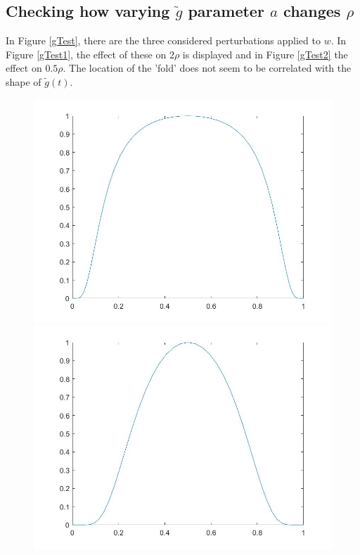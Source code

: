 \documentclass[11pt, a4paper]{article}
\theoremstyle{definition}
\begin{document}
\subsection{Checking how varying $\tilde g$ parameter $a$ changes $\rho$}
	In Figure \ref{gTest}, there are the three considered perturbations applied to $w$. In Figure \ref{gTest1}, the effect of these on $2\rho$ is displayed and in Figure \ref{gTest2} the effect on $0.5 \rho$. The location of the 'fold' does not seem to be correlated with the shape of $\tilde g(t)$.
	\begin{figure}[h]
		\includegraphics[scale=0.25]{Pert03new.jpg}
		\includegraphics[scale=0.25]{Pert07new.jpg}

\end{figure}
\end{document}
